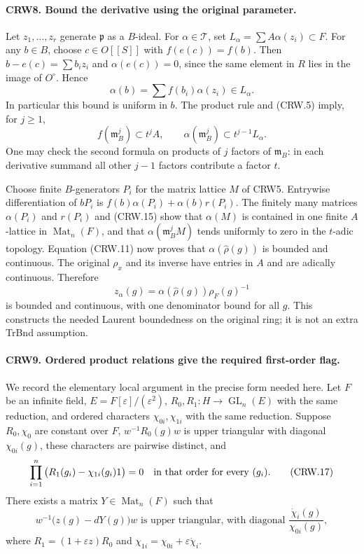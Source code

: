 \paragraph{CRW8. Bound the derivative using the original parameter.}
\label{claim:CRW8}
Let $z_1,\ldots,z_r$ generate $\mathfrak p$ as a $B$-ideal.
For $\alpha\in\mathcal T$, set
$L_\alpha=\sum A\alpha(z_i)\subset F$.
For any $b\in B$, choose $c\in O[[S]]$ with $f(e(c))=f(b)$.
Then $b-e(c)=\sum b_i z_i$ and $\alpha(e(c))=0$, since the
same element in $R$ lies in the image of $O^\circ$.  Hence
\[
 \alpha(b)=\sum f(b_i)\alpha(z_i)\in L_\alpha.
\]
In particular this bound is uniform in $b$.  The product rule
and (CRW.5) imply, for $j\ge1$,
\[
 f(\mathfrak m_B^j)\subset t^jA,
 \qquad \alpha(\mathfrak m_B^j)
          \subset t^{j-1}L_\alpha.                 \tag{CRW.15}
\]
One may check the second formula on products of $j$ factors
of $\mathfrak m_B$: in each derivative summand all other
$j-1$ factors contribute a factor $t$.

Choose finite $B$-generators $P_i$ for the matrix lattice $M$
of CRW5.  Entrywise differentiation of
$bP_i$ is $f(b)\alpha(P_i)+\alpha(b)r(P_i)$.
The finitely many matrices $\alpha(P_i)$ and $r(P_i)$ and
(CRW.15) show that $\alpha(M)$ is contained in one finite
$A$-lattice in $\operatorname{Mat}_n(F)$, and that
$\alpha(\mathfrak m_B^jM)$ tends uniformly to zero in the
$t$-adic topology.  Equation (CRW.11) now proves that
$\alpha(\widehat\rho(g))$ is bounded and continuous.
The original $\rho_x$ and its inverse have entries in $A$
and are adically continuous.  Therefore
\[
 z_\alpha(g)=\alpha(\widehat\rho(g))\rho_F(g)^{-1}
                                                               \tag{CRW.16}
\]
is bounded and continuous, with one denominator bound for
all $g$.  This constructs the needed Laurent boundedness on
the original ring; it is not an extra TrBnd assumption.

\paragraph{CRW9. Ordered product relations give the required first-order flag.}
\label{claim:CRW9}
We record the elementary local argument in the precise form
needed here.  Let $F$ be an infinite field,
$E=F[\varepsilon]/(\varepsilon^2)$,
$R_0,R_1:H\to\operatorname{GL}_n(E)$ with the same reduction,
and ordered characters $\chi_{0i},\chi_{1i}$ with the same
reduction.  Suppose $R_0,\chi_0$ are constant over $F$,
$w^{-1}R_0(g)w$ is upper triangular with diagonal
$\chi_{0i}(g)$, these characters are pairwise distinct, and
\[
 \prod_{i=1}^n\big(R_1(g_i)-\chi_{1i}(g_i)1\big)=0
 \quad\hbox{in that order for every }(g_i).         \tag{CRW.17}
\]
There exists a matrix $Y\in\operatorname{Mat}_n(F)$ such that
\[
 w^{-1}\big(z(g)-dY(g)\big)w
 \text{ is upper triangular, with diagonal }
 \frac{\dot\chi_i(g)}{\chi_{0i}(g)},                \tag{CRW.18}
\]
where $R_1=(1+\varepsilon z)R_0$ and
$\chi_{1i}=\chi_{0i}+\varepsilon\dot\chi_i$.

